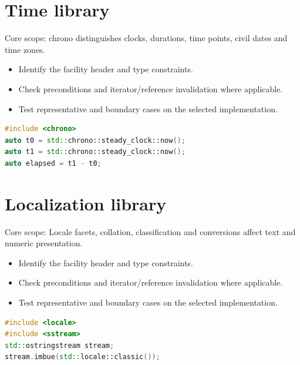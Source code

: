 \documentclass[11pt]{article}
\begin{document}
\section{Time library}
Core scope: chrono distinguishes clocks, durations, time points, civil dates and time zones.

\begin{itemize}[leftmargin=*,itemsep=1pt,topsep=3pt]
\item Identify the facility header and type constraints.
\item Check preconditions and iterator/reference invalidation where applicable.
\item Test representative and boundary cases on the selected implementation.
\end{itemize}
\begin{lstlisting}[language=C++]
#include <chrono>
auto t0 = std::chrono::steady_clock::now();
auto t1 = std::chrono::steady_clock::now();
auto elapsed = t1 - t0;
\end{lstlisting}
\section{Localization library}
Core scope: Locale facets, collation, classification and conversions affect text and numeric presentation.

\begin{itemize}[leftmargin=*,itemsep=1pt,topsep=3pt]
\item Identify the facility header and type constraints.
\item Check preconditions and iterator/reference invalidation where applicable.
\item Test representative and boundary cases on the selected implementation.
\end{itemize}
\begin{lstlisting}[language=C++]
#include <locale>
#include <sstream>
std::ostringstream stream;
stream.imbue(std::locale::classic());
\end{lstlisting}
\end{document}
